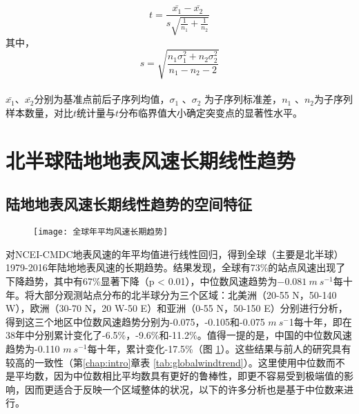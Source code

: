 \begin{equation} \label{eq:mvttest}
t = \frac{\bar{x_{1}} - \bar{x_{2}}}{ s \sqrt{\frac{1}{n_{1}} + \frac{1}{n_{2}}}}
\end{equation} 
其中，
\begin{equation} 
s = \sqrt{\frac{n_{1}\sigma_{1}^{2} + n_{2}\sigma_{2}^{2}}{n_{1} - n_{2} - 2}}
\end{equation} ~\\
$\bar{x_{1}}$、$\bar{x_{2}}$分别为基准点前后子序列均值，$\sigma_{1}$ 、$\sigma_{2}$  为子序列标准差，$n_{1}$ 、$n_{2}$为子序列样本数量，对比$t$统计量与$t$分布临界值大小确定突变点的显著性水平。

\section{北半球陆地地表风速长期线性趋势}\label{sec:NHwindchange}

\subsection{陆地地表风速长期线性趋势的空间特征}

\begin{figure}[!b]
    \centering
    \texttt{[image: 全球年平均风速长期趋势]}
    \label{fig:NHwindtrend}
\end{figure}

对NCEI-CMDC地表风速的年平均值进行线性回归，得到全球（主要是北半球）1979-2016年陆地地表风速的长期趋势。结果发现，全球有73\%的站点风速出现了下降趋势，其中有67\%显著下降（p < 0.01），中位数风速趋势为$ -0.081 ~ m ~ s^{-1}$每十年。将大部分观测站点分布的北半球分为三个区域：北美洲（20-55 N，50-140 W），欧洲（30-70 N，20 W-50 E）和亚洲（0-55 N，50-150 E）分别进行分析，得到这三个地区中位数风速趋势分别为-0.075，-0.105和-0.075 $m ~ s^{-}$1每十年，即在38年中分别累计变化了-6.5\%，-9.6\%和-11.2\%。值得一提的是，中国的中位数风速趋势为-0.110 $m ~ s^{-1}$每十年，累计变化-17.5\%（图 \ref{fig:NHwindtrend}）。这些结果与前人的研究具有较高的一致性（第\ref{chap:intro}章\;表 \ref{tab:globalwindtrend}）。这里使用中位数而不是平均数，因为中位数相比平均数具有更好的鲁棒性，即更不容易受到极端值的影响，因而更适合于反映一个区域整体的状况，以下的许多分析也是基于中位数来进行。

